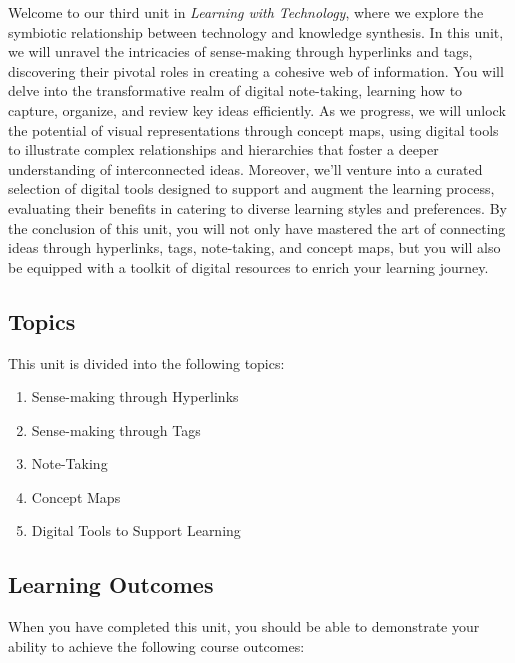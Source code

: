 \documentclass[
]{book}
\providecommand{\tightlist}{%
  \setlength{\itemsep}{0pt}\setlength{\parskip}{0pt}}
\theoremstyle{definition}
\theoremstyle{definition}
\theoremstyle{definition}
\theoremstyle{definition}
\theoremstyle{remark}
\begin{document}
Welcome to our third unit in \emph{Learning with Technology}, where we explore the symbiotic relationship between technology and knowledge synthesis. In this unit, we will unravel the intricacies of sense-making through hyperlinks and tags, discovering their pivotal roles in creating a cohesive web of information. You will delve into the transformative realm of digital note-taking, learning how to capture, organize, and review key ideas efficiently. As we progress, we will unlock the potential of visual representations through concept maps, using digital tools to illustrate complex relationships and hierarchies that foster a deeper understanding of interconnected ideas. Moreover, we'll venture into a curated selection of digital tools designed to support and augment the learning process, evaluating their benefits in catering to diverse learning styles and preferences. By the conclusion of this unit, you will not only have mastered the art of connecting ideas through hyperlinks, tags, note-taking, and concept maps, but you will also be equipped with a toolkit of digital resources to enrich your learning journey.

\hypertarget{topics-2}{%
\subsection*{Topics}\label{topics-2}}

This unit is divided into the following topics:

\begin{enumerate}
\def\labelenumi{\arabic{enumi}.}
\tightlist
\item
  Sense-making through Hyperlinks
\item
  Sense-making through Tags
\item
  Note-Taking
\item
  Concept Maps
\item
  Digital Tools to Support Learning
\end{enumerate}

\hypertarget{learning-outcomes-2}{%
\subsection*{Learning Outcomes}\label{learning-outcomes-2}}

When you have completed this unit, you should be able to demonstrate your ability to achieve the following course outcomes:
\end{document}
